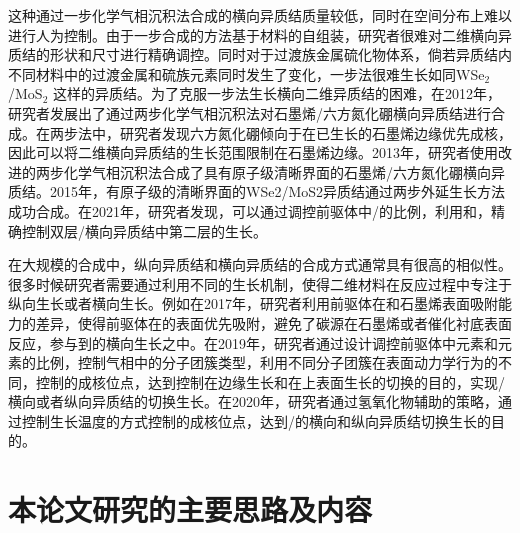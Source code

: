     这种通过一步化学气相沉积法合成的横向异质结质量较低，同时在空间分布上难以进行人为控制。由于一步合成的方法基于材料的自组装，研究者很难对二维横向异质结的形状和尺寸进行精确调控。同时对于过渡族金属硫化物体系，倘若异质结内不同材料中的过渡金属和硫族元素同时发生了变化，一步法很难生长如同WSe$_2$/MoS$_2$ 这样的异质结。为了克服一步法生长横向二维异质结的困难，在2012年，研究者发展出了通过两步化学气相沉积法对石墨烯/六方氮化硼横向异质结进行合成。在两步法中，研究者发现六方氮化硼倾向于在已生长的石墨烯边缘优先成核，因此可以将二维横向异质结的生长范围限制在石墨烯边缘。2013年，研究者使用改进的两步化学气相沉积法合成了具有原子级清晰界面的石墨烯/六方氮化硼横向异质结。2015年，有原子级的清晰界面的WSe2/MoS2异质结通过两步外延生长方法成功合成。在2021年，研究者发现，可以通过调控前驱体中/的比例，利用和，精确控制双层/横向异质结中第二层的生长。

    在大规模的合成中，纵向异质结和横向异质结的合成方式通常具有很高的相似性。很多时候研究者需要通过利用不同的生长机制，使得二维材料在反应过程中专注于纵向生长或者横向生长。例如在2017年，研究者利用前驱体在和石墨烯表面吸附能力的差异，使得前驱体在的表面优先吸附，避免了碳源在石墨烯或者催化衬底表面反应，参与到的横向生长之中。在2019年，研究者通过设计调控前驱体中元素和元素的比例，控制气相中的分子团簇类型，利用不同分子团簇在表面动力学行为的不同，控制的成核位点，达到控制在边缘生长和在上表面生长的切换的目的，实现/横向或者纵向异质结的切换生长。在2020年，研究者通过氢氧化物辅助的策略，通过控制生长温度的方式控制的成核位点，达到/的横向和纵向异质结切换生长的目的。
\section{本论文研究的主要思路及内容}
